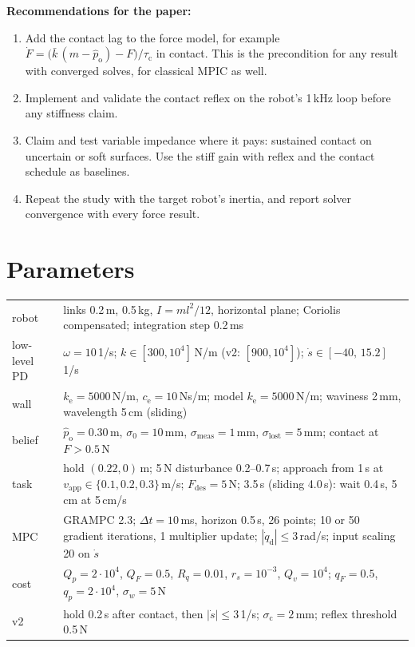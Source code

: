\documentclass[11pt,a4paper]{article}
\newcommand{\kb}{\bar{k}}
\newcommand{\dqd}{\dot{q}_{\mathrm{d}}}
\newcommand{\phat}{\hat{p}_{\mathrm{o}}}
\newcommand{\ke}{k_{\mathrm{e}}}
\newcommand{\Fdes}{F_{\mathrm{des}}}
\newcommand{\vapp}{v_{\mathrm{app}}}
\begin{document}
\textbf{Recommendations for the paper:}
\begin{enumerate}[leftmargin=16pt]
\item Add the contact lag to the force model, for example
  $\dot F=\bigl(\kb\,(m-\phat)-F\bigr)/\tau_\mathrm{c}$ in contact. This is the precondition for any result
  with converged solves, for classical MPIC as well.
\item Implement and validate the contact reflex on the robot's 1\,kHz loop before any stiffness claim.
\item Claim and test variable impedance where it pays: sustained contact on uncertain or soft surfaces.
  Use the stiff gain with reflex and the contact schedule as baselines.
\item Repeat the study with the target robot's inertia, and report solver convergence with every force
  result.
\end{enumerate}

\appendix
\section{Parameters}\label{app:params}
\begin{center}\small
\begin{tabularx}{\linewidth}{@{}lX@{}}
\toprule
robot & links 0.2\,m, 0.5\,kg, $I=ml^2/12$, horizontal plane; Coriolis compensated; integration step 0.2\,ms \\
low-level PD & $\omega=10$\,1/s; $k\in[300,10^4]$\,N/m (v2: $[900,10^4]$); $\dot s\in[-40,\,15.2]$\,1/s \\
wall & $\ke=5000$\,N/m, $c_\mathrm{e}=10$\,Ns/m; model $\ke=5000$\,N/m; waviness 2\,mm, wavelength 5\,cm (sliding) \\
belief & $\phat=0.30$\,m, $\sigma_0=10$\,mm, $\sigma_\mathrm{meas}=1$\,mm, $\sigma_\mathrm{lost}=5$\,mm; contact at $F>0.5$\,N \\
task & hold $(0.22,0)$\,m; 5\,N disturbance 0.2--0.7\,s; approach from 1\,s at $\vapp\in\{0.1,0.2,0.3\}$\,m/s; $\Fdes=5$\,N; 3.5\,s (sliding 4.0\,s): wait 0.4\,s, 5\,cm at 5\,cm/s \\
MPC & GRAMPC 2.3; $\Delta t=10$\,ms, horizon 0.5\,s, 26 points; 10 or 50 gradient iterations, 1 multiplier update; $|\dqd|\le3$\,rad/s; input scaling 20 on $\dot s$ \\
cost & $Q_p=2\cdot10^4$, $Q_F=0.5$, $R_q=0.01$, $r_s=10^{-3}$, $Q_v=10^4$; $q_F=0.5$, $q_p=2\cdot10^4$, $\sigma_w=5$\,N \\
v2 & hold 0.2\,s after contact, then $|\dot s|\le3$\,1/s; $\sigma_\mathrm{c}=2$\,mm; reflex threshold 0.5\,N \\
\bottomrule
\end{tabularx}
\end{center}
\end{document}
